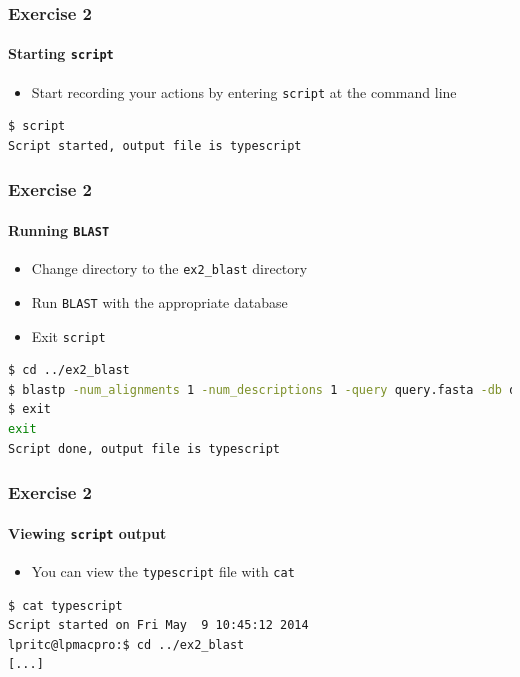 \documentclass[table]{beamer}
\begin{document}
  \begin{frame}[fragile]
    \frametitle{Exercise 2}
    \framesubtitle{Starting \texttt{script}}    
    \begin{itemize}
      \item Start recording your actions by entering \texttt{script} at the command line      
    \end{itemize}
    \begin{lstlisting}[language=bash]
$ script
Script started, output file is typescript
    \end{lstlisting}    
\end{frame}

  \begin{frame}[fragile]
    \frametitle{Exercise 2}
    \framesubtitle{Running \texttt{BLAST}}
    \begin{itemize}
      \item Change directory to the \texttt{ex2\_blast} directory
      \item Run \texttt{BLAST} with the appropriate database
      \item Exit \texttt{script}
    \end{itemize}
    \begin{lstlisting}[language=bash]
$ cd ../ex2_blast
$ blastp -num_alignments 1 -num_descriptions 1 -query query.fasta -db dbA
$ exit
exit
Script done, output file is typescript
    \end{lstlisting}    
\end{frame}

  \begin{frame}[fragile]
    \frametitle{Exercise 2}
    \framesubtitle{Viewing \texttt{script} output}
    \begin{itemize}
      \item You can view the \texttt{typescript} file with \texttt{cat}
    \end{itemize}
    \begin{lstlisting}[language=bash]
$ cat typescript
Script started on Fri May  9 10:45:12 2014
lpritc@lpmacpro:$ cd ../ex2_blast
[...]
    \end{lstlisting}    
\end{frame}
\end{document}

